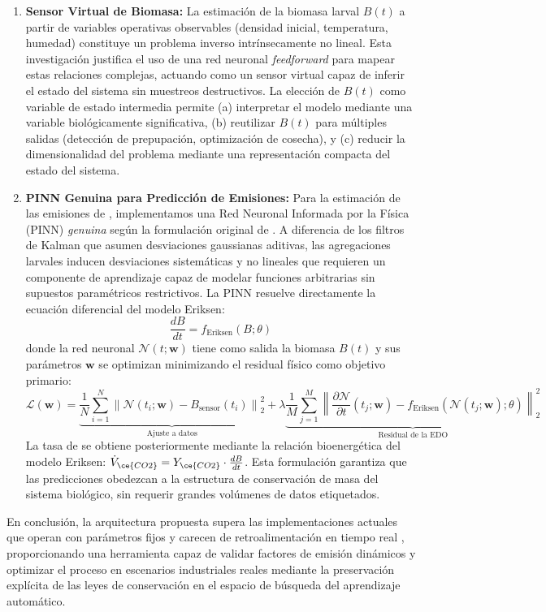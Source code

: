 \begin{enumerate}
    \item \textbf{Sensor Virtual de Biomasa:} La estimación de la biomasa larval $B(t)$ a partir de variables operativas observables (densidad inicial, temperatura, humedad) constituye un problema inverso intrínsecamente no lineal. Esta investigación justifica el uso de una red neuronal \textit{feedforward} para mapear estas relaciones complejas, actuando como un sensor virtual capaz de inferir el estado del sistema sin muestreos destructivos. La elección de $B(t)$ como variable de estado intermedia permite (a) interpretar el modelo mediante una variable biológicamente significativa, (b) reutilizar $B(t)$ para múltiples salidas (detección de prepupación, optimización de cosecha), y (c) reducir la dimensionalidad del problema mediante una representación compacta del estado del sistema.
    
    \item \textbf{PINN Genuina para Predicción de Emisiones:} Para la estimación de las emisiones de , implementamos una Red Neuronal Informada por la Física (PINN) \textit{genuina} según la formulación original de \textcite{raissiPhysicsinformedNeuralNetworks2019a}. A diferencia de los filtros de Kalman que asumen desviaciones gaussianas aditivas, las agregaciones larvales inducen desviaciones sistemáticas y no lineales que requieren un componente de aprendizaje capaz de modelar funciones arbitrarias sin supuestos paramétricos restrictivos. La PINN resuelve directamente la ecuación diferencial del modelo Eriksen:
    \[
    \frac{dB}{dt} = f_{\text{Eriksen}}(B; \theta)
    \]
    donde la red neuronal $\mathcal{N}(t; \mathbf{w})$ tiene como salida la biomasa $B(t)$ y sus parámetros $\mathbf{w}$ se optimizan minimizando el residual físico como objetivo primario:
    \[
    \mathcal{L}(\mathbf{w}) = \underbrace{\frac{1}{N}\sum_{i=1}^{N} \left\| \mathcal{N}(t_i; \mathbf{w}) - B_{\text{sensor}}(t_i) \right\|_2^2}_{\text{Ajuste a datos}} + \lambda \underbrace{\frac{1}{M}\sum_{j=1}^{M} \left\| \frac{\partial \mathcal{N}}{\partial t}(t_j; \mathbf{w}) - f_{\text{Eriksen}}(\mathcal{N}(t_j; \mathbf{w}); \theta) \right\|_2^2}_{\text{Residual de la EDO}}
    \]
    La tasa de  se obtiene posteriormente mediante la relación bioenergética del modelo Eriksen: $\dot{V}_{\ce{CO2}} = Y_{\ce{CO2}} \cdot \frac{dB}{dt}$. Esta formulación garantiza que las predicciones obedezcan a la estructura de conservación de masa del sistema biológico, sin requerir grandes volúmenes de datos etiquetados.
\end{enumerate}

En conclusión, la arquitectura propuesta supera las implementaciones actuales que operan con parámetros fijos y carecen de retroalimentación en tiempo real \parencite{kamilarisReviewPracticeBig2017,liuOptimizingDataPipelines2023a}, proporcionando una herramienta capaz de validar factores de emisión dinámicos y optimizar el proceso en escenarios industriales reales mediante la preservación explícita de las leyes de conservación en el espacio de búsqueda del aprendizaje automático.